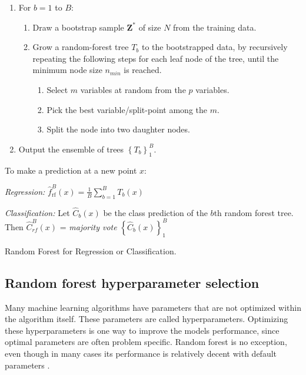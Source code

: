 \begin{algorithm}
    \footnotesize
    \begin{minipage}{.92\linewidth}
    \begin{enumerate}
        \item For $b = 1$ to $B$:
        \begin{enumerate}
            \item Draw a bootstrap sample $\bm{Z}^{*}$ of size $N$ from the training data.
            \item Grow a random-forest tree $T_b$ to the bootstrapped data, by recursively repeating the following steps for each leaf node of the tree, until the minimum node size $n_{min}$ is reached.
            \begin{enumerate}
                \item Select $m$ variables at random from the $p$ variables.
                \item Pick the best variable/split-point among the $m$.
                \item Split the node into two daughter nodes.
            \end{enumerate}
        \end{enumerate}
        \item Output the ensemble of trees $\left\{ T _ { b } \right\} _ { 1 } ^ { B }$.
    \end{enumerate}
    To make a prediction at a new point $x$:

    \textit{Regression:} $\hat { f } _ { \mathrm { rf } } ^ { B } ( x ) = \frac { 1 } { B } \sum _ { b = 1 } ^ { B } T _ { b } ( x )$

    \textit{Classification:} Let $\hat { C } _ { b } ( x )$ be the class prediction of the $b$th random forest
    tree. Then $\hat{C} _ { r f } ^ { B } ( x )$ = \textit{majority vote} $\left\{ \hat { C } _ { b } ( x ) \right\} _ { 1 } ^ { B }$
    \end{minipage}
    \caption{\footnotesize Random Forest for Regression or Classification.}
    \label{alg:random_forest}
\end{algorithm}

\subsection{Random forest hyperparameter selection}
Many machine learning algorithms have parameters that are not optimized within the algorithm itself. These parameters are called hyperparameters. Optimizing these hyperparameters is one way to improve the models performance, since optimal parameters are often problem specific. Random forest is no exception, even though in many cases its performance is relatively decent with default parameters \cite{probst2018hyperparameters}.

